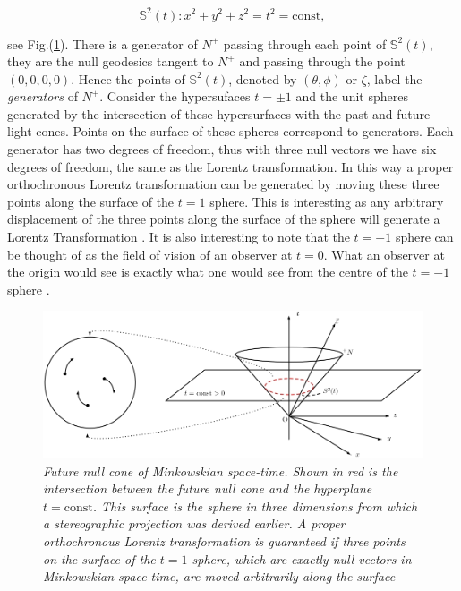 \begin{equation}\label{Ext_Complex_2Sphere_Definition}
\mathbb{S}^2 (t) : x^2 + y^2 + z^2 = t^2 = \text{const}, 
\end{equation}

\noindent see Fig.(\ref{Ext_Complex_Intersection_Cone_Plane_Fig}). There is a generator of $N^+$ passing through each point of $\mathbb{S}^2 (t)$, they are the null geodesics tangent to $N^+$ and passing through the point $(0,0,0,0)$. Hence the points of $\mathbb{S}^2 (t)$, denoted by $(\theta,\phi)$ or $\zeta$, label the \textit{generators} of $N^{+}$. Consider the hypersufaces $t= \pm 1$ and the unit spheres generated by the intersection of these hypersurfaces with the past and future light cones. Points on the surface of these spheres correspond to generators. Each generator has two degrees of freedom, thus with three null vectors we have six degrees of freedom, the same as the Lorentz transformation. In this way a proper orthochronous Lorentz transformation can be generated by moving these three points along the surface of the $t = 1$ sphere. This is interesting as any arbitrary displacement of the three points along the surface of the sphere will generate a Lorentz Transformation \cite[p. 100]{Relativity_Synge}. It is also interesting to note that the $t = -1$ sphere can be thought of as the field of vision of an observer at $t = 0$. What an observer at the origin would see is exactly what one would see from the centre of the $t = -1$ sphere \cite[p. 9]{Spinors_I_Penrose}.   
 
\begin{figure}[h!]
\begin{center}
\caption{\textit{Future null cone of Minkowskian space-time. Shown in red is the intersection between the future null cone and the hyperplane $t=\text{const}$. This surface is the sphere in three dimensions from which a stereographic projection was derived earlier. A proper orthochronous Lorentz transformation is guaranteed if three points on the surface of the $t = 1$ sphere, which are exactly null vectors in Minkowskian space-time, are moved arbitrarily along the surface}}
\label{Ext_Complex_Intersection_Cone_Plane_Fig}
\includegraphics[scale=0.6]{figs/4_5_2.jpg}
\end{center}
\end{figure}

